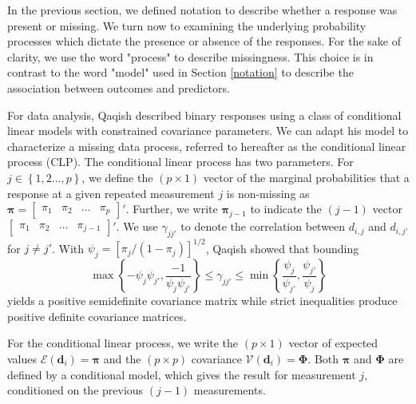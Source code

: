 \documentclass[11pt]{article}
\begin{document}
In the previous section, we defined notation to describe whether a response was present or missing. We turn now to examining the underlying probability processes which dictate the presence or absence of the responses. For the sake of clarity, we use the word "process" to describe missingness. This choice is in contrast to the word "model" used in Section \ref{notation} to describe the association between outcomes and predictors.

For data analysis, Qaqish \cite{qaqish_family_2003} described binary responses using a class of conditional linear models with constrained covariance parameters. We can adapt his model to characterize a missing data process, referred to hereafter as the conditional linear process (CLP). The conditional linear process has two parameters. For $j\in\left\{1,2\ldots,p\right\}$, we define the $\left(p\times 1\right)$ vector of the marginal probabilities that a response at a given repeated measurement $j$ is non-missing as $\boldsymbol{\pi}=\begin{bmatrix}\pi_{1}&\pi_{2}&\ldots&\pi_{p}\end{bmatrix}'$. Further, we write $\boldsymbol{\pi}_{j-1}$ to indicate the $\left(j-1\right)$ vector $\begin{bmatrix}\pi_{1}&\pi_{2}&\ldots&\pi_{j-1}\end{bmatrix}'$. We use $\gamma_{jj'}$ to denote the correlation between $d_{i,j}$ and $d_{i,j'}$ for $j\neq j'$. With $\psi_{j}=\left[\pi_{j}/\left(1-\pi_{j}\right)\right]^{1/2}$, Qaqish \cite{qaqish_family_2003} showed that bounding
\begin{equation}
\max\left\{-\psi_{j}\psi_{j'},\frac{-1}{\psi_{j}\psi_{j'}}\right\}\leq\gamma_{jj'}\leq\min\left\{\frac{\psi_{j}}{\psi_{j'}},\frac{\psi_{j'}}{\psi_{j}}\right\}
\end{equation}
yields a positive semidefinite covariance matrix while strict inequalities produce positive definite covariance matrices.

For the conditional linear process, we write the $\left(p\times 1\right)$ vector of expected values $\boldsymbol{\mathcal{E}}\left(\boldsymbol{d}_{i}\right)=\boldsymbol{\pi}$ and the $\left(p\times p\right)$ covariance $\boldsymbol{\mathcal{V}}\left(\boldsymbol{d}_{i}\right)=\boldsymbol{\Phi}$. Both $\boldsymbol{\pi}$ and $\boldsymbol{\Phi}$ are defined by a conditional model, which gives the result for measurement $j$, conditioned on the previous $\left(j-1\right)$ measurements.
\end{document}
